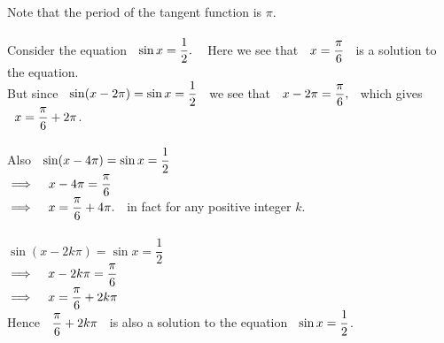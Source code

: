\documentclass[11pt,a4paper]{article}
\begin{document}
Note that the period of the tangent function is $\pi$.\\\\


Consider the equation $\hspace{0.2cm} \sin x = \dfrac{1}{2}.\hspace{0.3cm}$ Here we see that $\hspace{0.2cm} x =  \dfrac{\pi}{6}\hspace{0.2cm}$ is a solution to the equation.\\
But since $\hspace{0.2cm} \sin ( x - 2\pi) = \sin x = \dfrac{1}{2}\hspace{0.2cm}$ we see that $\hspace{0.2cm} x - 2\pi = \dfrac{\pi}{6},\hspace{0.2cm}$ which gives $\hspace{0.2cm} x = \dfrac{\pi}{6} + 2\pi$.\\\\




Also $\hspace{0.2cm} \sin (x - 4\pi) = \sin x = \dfrac{1}{2}$\\

$\implies \hspace{0.3cm} x - 4\pi = \dfrac{\pi}{6}$\\

$\implies \hspace{0.3cm} x = \dfrac{\pi}{6} + 4\pi.\hspace{0.2cm}$ in fact for any positive integer $k$.\\\\





$\sin ( x - 2k\pi) = \sin x = \dfrac{1}{2}$\\

$\implies \hspace{0.3cm} x - 2k\pi = \dfrac{\pi}{6}$\\

$\implies \hspace{0.3cm} x = \dfrac{\pi}{6} + 2k\pi$\\

Hence $\hspace{0.2cm} \dfrac{\pi}{6} + 2k\pi\hspace{0.2cm}$ is also a solution to the equation $\hspace{0.2cm} \sin x = \dfrac{1}{2}$.\\\\
\end{document}
